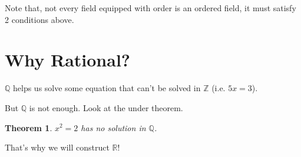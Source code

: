 \documentclass[12pt]{article}
\newcommand{\RR}{\mathbb{R}}   %
\newcommand{\ZZ}{\mathbb{Z}}   %
\newcommand{\QQ}{\mathbb{Q}}   %
\theoremstyle{definition}
\theoremstyle{plain}
\newtheorem{theorem}[definition]{Theorem}
\begin{document}
\begin{note}
Note that, not every field equipped with order is an ordered field, it must satisfy 2 conditions above.
\end{note}

\section{Why Rational?}
\begin{note}
$\QQ$ helps us solve some equation that can't be solved in $\ZZ$ (i.e. $5x=3$).

But $\QQ$ is not enough. Look at the under theorem.
\end{note}

\begin{theorem}
$x^2 = 2$ has no solution in $\QQ$.
\end{theorem}

\begin{note}
That's why we will construct $\RR$!
\end{note}
\end{document}
